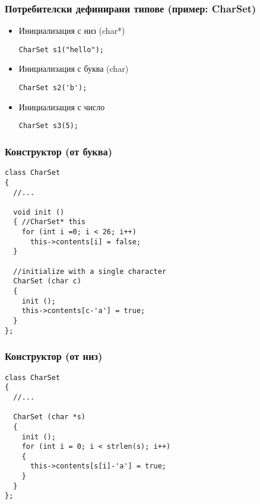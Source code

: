 \documentclass{beamer}
\begin{document}
\begin{frame}[fragile]
\frametitle{Потребителски дефинирани типове (пример: CharSet)}

\begin{itemize}
  \item Инициализация с низ (char*)

\begin{flushleft}
\begin{lstlisting}
CharSet s1("hello");
\end{lstlisting}  
\end{flushleft}
\pause
  \item Инициализация с буква (char)

\begin{flushleft}
\begin{lstlisting}
CharSet s2('b');
\end{lstlisting}  
\end{flushleft}
\pause

  \item Инициализация с число

\begin{flushleft}
\begin{lstlisting}
CharSet s3(5);
\end{lstlisting}  
\end{flushleft}


\end{itemize}

\end{frame}

\begin{frame}[fragile]
\frametitle{Конструктор (от буква)}


\begin{flushleft}
\begin{lstlisting}
class CharSet
{
  //...

  void init ()
  { //CharSet* this
    for (int i =0; i < 26; i++)
      this->contents[i] = false;
  }

  //initialize with a single character
  CharSet (char c)
  {
    init ();
    this->contents[c-'a'] = true;
  }
};
\end{lstlisting}  
\end{flushleft}
\end{frame}


\begin{frame}[fragile]
\frametitle{Конструктор (от низ)}


\begin{flushleft}
\begin{lstlisting}
class CharSet
{
  //...

  CharSet (char *s)
  {
    init ();
    for (int i = 0; i < strlen(s); i++)
    {
      this->contents[s[i]-'a'] = true;
    }   
  }
};
\end{lstlisting}  
\end{flushleft}
\end{frame}
\end{document}
